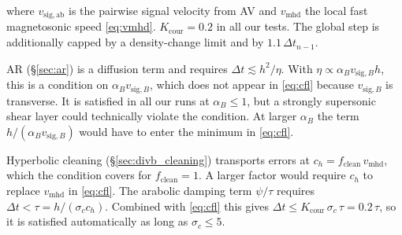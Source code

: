 where $v_\mathrm{sig,ab}$ is the pairwise signal velocity from AV and $v_\mathrm{mhd}$ the local fast magnetosonic speed \eqref{eq:vmhd}. $K_\mathrm{cour} = 0.2$ in all our tests. The global step is additionally capped by a density-change limit and by $1.1\,\Delta t_{n-1}$.


AR (§\ref{sec:ar}) is a diffusion term and requires $\Delta t \lesssim h^2/\eta$. With $\eta \propto \alpha_B v_{\mathrm{sig},B} h$, this is a condition on $\alpha_B v_{\mathrm{sig},B}$, which does not appear in \eqref{eq:cfl} because $v_{\mathrm{sig},B}$ is transverse. It is satisfied in all our runs at $\alpha_B \leq 1$, but a strongly supersonic shear layer could technically violate the condition. At larger $\alpha_B$ the term $h/(\alpha_B v_{\mathrm{sig},B})$ would have to enter the minimum in \eqref{eq:cfl}.

Hyperbolic cleaning (§\ref{sec:divb_cleaning}) transports errors at $c_h = f_\mathrm{clean}\, v_\mathrm{mhd}$, which the condition covers for $f_\mathrm{clean} = 1$. A larger factor would require $c_h$ to replace $v_\mathrm{mhd}$ in \eqref{eq:cfl}. The arabolic damping term $\psi/\tau$ requires $\Delta t < \tau = h/(\sigma_c c_h)$. Combined with \eqref{eq:cfl} this gives $\Delta t \leq K_\mathrm{cour}\,\sigma_c\,\tau = 0.2\,\tau$, so it is satisfied automatically as long as $\sigma_c \leq 5$.


